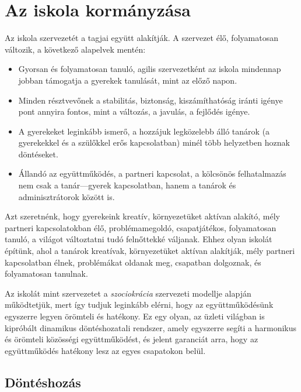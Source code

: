 \hypertarget{az-iskola-kormanyzasa}{%
\section{Az iskola kormányzása}\label{az-iskola-kormanyzasa}}

Az iskola szervezetét a tagjai együtt alakítják. A szervezet élő,
folyamatosan változik, a következő alapelvek mentén:

\begin{itemize}
\item
  Gyorsan és folyamatosan tanuló, agilis szervezetként az iskola
  mindennap jobban támogatja a gyerekek tanulását, mint az előző napon.
\item
  Minden résztvevőnek a stabilitás, biztonság, kiszámíthatóság iránti igénye
  pont annyira fontos, mint a változás, a javulás, a fejlődés igénye.
\item
  A gyerekeket leginkább ismerő, a hozzájuk legközelebb álló tanárok
  (a gyerekekkel és a szülőkkel erős kapcsolatban) minél több helyzetben
  hoznak döntéseket.
\item
  Állandó az együttműködés, a partneri kapcsolat, a kölcsönös
  felhatalmazás
  nem csak a tanár---gyerek kapcsolatban,
  hanem a tanárok és adminisztrátorok között is.
\end{itemize}

Azt szeretnénk, hogy gyerekeink kreatív, környezetüket aktívan alakító,
mély partneri kapcsolatokban élő, problémamegoldó, csapatjátékos,
folyamatosan tanuló, a világot változtatni tudó felnőttekké váljanak.
Ehhez olyan iskolát építünk, ahol a tanárok kreatívak, környezetüket
aktívan alakítják, mély partneri kapcsolatban élnek, problémákat oldanak
meg, csapatban dolgoznak, és folyamatosan tanulnak.

Az iskolát mint szervezetet a \emph{szociokrácia}
szervezeti modellje alapján működtetjük, mert így tudjuk leginkább elérni,
hogy az együttműködésünk egyszerre legyen
örömteli és hatékony. Ez egy
olyan, az üzleti világban is kipróbált dinamikus döntéshozatali
rendszer, amely egyszerre segíti a harmonikus és örömteli közösségi
együttműködést, és jelent garanciát arra, hogy az együttműködés hatékony
lesz az egyes csapatokon belül.

\hypertarget{donteshozas}{%
\subsection{Döntéshozás}\label{donteshozas}}

